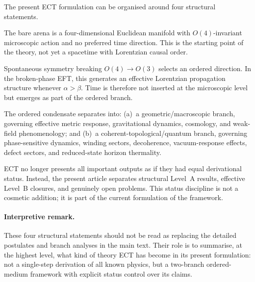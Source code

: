 \documentclass[11pt,a4paper]{article}
\numberwithin{equation}{section}
\begin{document}
The present ECT formulation can be organised around four structural
statements.

\begin{description}[leftmargin=1.2em, labelindent=0pt, style=unboxed]

\item[\textbf{(S1) Euclidean microscopic substrate.}]
The bare arena is a four-dimensional Euclidean manifold with
$O(4)$-invariant microscopic action and no preferred time direction.
This is the starting point of the theory, not yet a spacetime with
Lorentzian causal order.

\item[\textbf{(S2) Ordered Lorentzian branch.}]
Spontaneous symmetry breaking $O(4)\to O(3)$ selects an ordered
direction.
In the broken-phase EFT, this generates an effective Lorentzian
propagation structure whenever $\alpha>\beta$.
Time is therefore not inserted at the microscopic level but emerges as
part of the ordered branch.

\item[\textbf{(S3) Two branches of one condensate.}]
The ordered condensate separates into:
(a)~a geometric/macroscopic branch, governing effective metric response,
gravitational dynamics, cosmology, and weak-field phenomenology;
and
(b)~a coherent-topological/quantum branch, governing phase-sensitive
dynamics, winding sectors, decoherence, vacuum-response effects,
defect sectors, and reduced-state horizon thermality.

\item[\textbf{(S4) Explicit status discipline.}]
ECT no longer presents all important outputs as if they had equal
derivational status.
Instead, the present article separates structural Level~A results,
effective Level~B closures, and genuinely open problems.
This status discipline is not a cosmetic addition; it is part of the
current formulation of the framework.

\end{description}

\paragraph{Interpretive remark.}
These four structural statements should not be read as replacing the
detailed postulates and branch analyses in the main text.
Their role is to summarise, at the highest level, what kind of theory
ECT has become in its present formulation:
not a single-step derivation of all known physics, but a two-branch
ordered-medium framework with explicit status control over its claims.
\end{document}
